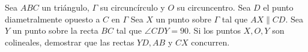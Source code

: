 \begin{problem}
    Sea $ABC$ un tri\'angulo, $\Gamma$ su circunc\'irculo y $O$ su circuncentro. Sea $D$ el punto diametralmente opuesto a $C$ en $\Gamma$
    Sea $X$ un punto sobre $\Gamma$ tal que $AX \parallel CD$. Sea $Y$ un punto sobre la recta $BC$ tal que $\angle CDY=90$.
    Si los puntos $X,O,Y$ son colineales, demostrar que las rectas $YD, AB$ y $CX$ concurren.

    \label{24MEXIBEROTSTA1}
\end{problem}